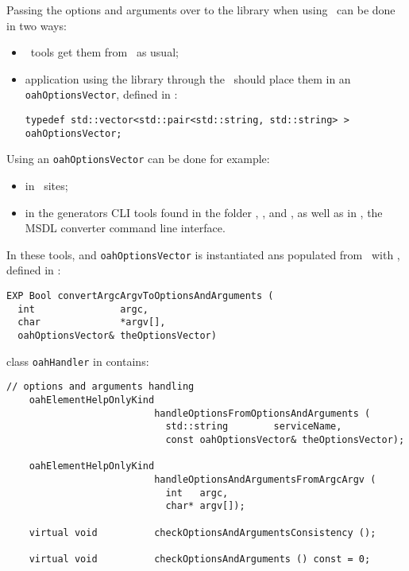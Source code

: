 Passing the options and arguments over to the library when using \mf\ can be done in two ways:
\begin{itemize}
\item \CLI\ tools get them from \argcargv\ as usual;
\item application using the library through the \API\ should place them in an {\tt oahOptionsVector}, defined in :
\begin{lstlisting}[language=CPlusPlus]
typedef std::vector<std::pair<std::string, std::string> > oahOptionsVector;
\end{lstlisting}

\end{itemize}

Using an {\tt oahOptionsVector} can be done for example:
\begin{itemize}
\item in \Web\ sites; %
\item in the generators CLI tools found in the \clisamples{} folder , ,  and , as well as in , the MSDL converter command line interface.
\end{itemize}

 In these tools, and {\tt oahOptionsVector} is instantiated ans populated from \argcargv\ with , defined in :%
\begin{lstlisting}[language=CPlusPlus]
EXP Bool convertArgcArgvToOptionsAndArguments (
  int               argc,
  char              *argv[],
  oahOptionsVector& theOptionsVector)
\end{lstlisting}

class   {\tt oahHandler} in  contains:
\begin{lstlisting}[language=CPlusPlus]
    // options and arguments handling
    oahElementHelpOnlyKind
                          handleOptionsFromOptionsAndArguments (
                            std::string        serviceName,
                            const oahOptionsVector& theOptionsVector);

    oahElementHelpOnlyKind
                          handleOptionsAndArgumentsFromArgcArgv (
                            int   argc,
                            char* argv[]);

    virtual void          checkOptionsAndArgumentsConsistency ();

    virtual void          checkOptionsAndArguments () const = 0;
\end{lstlisting}


